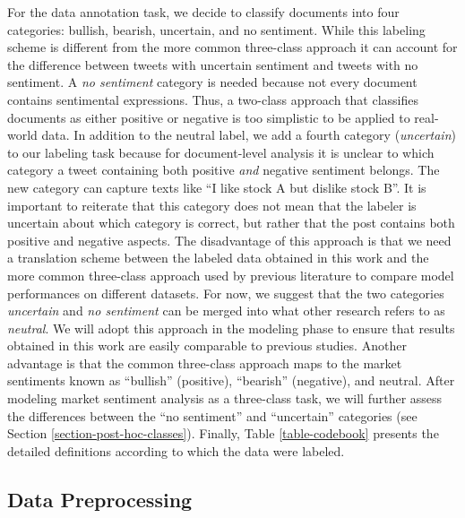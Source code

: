 For the data annotation task, we decide to classify documents into four categories: bullish, bearish, uncertain, and no sentiment. While this labeling scheme is different from the more common three-class approach it can account for the difference between tweets with uncertain sentiment and tweets with no sentiment. A \emph{no sentiment} category is needed because not every document contains sentimental expressions. Thus, a two-class approach that classifies documents as either positive or negative is too simplistic to be applied to real-world data. In addition to the neutral label, we add a fourth category (\emph{uncertain}) to our labeling task because for document-level analysis it is unclear to which category a tweet containing both positive \emph{and} negative sentiment belongs. The new category can capture texts like ``I like stock A but dislike stock B''. It is important to reiterate that this category does not mean that the labeler is uncertain about which category is correct, but rather that the post contains both positive and negative aspects.
 The disadvantage of this approach is that we need a translation scheme between the labeled data obtained in this work and the more common three-class approach used by previous literature to compare model performances on different datasets. For now, we suggest that the two categories \emph{uncertain} and \emph{no sentiment} can be merged into what other research refers to as \emph{neutral}. We will adopt this approach in the modeling phase to ensure that results obtained in this work are easily comparable to previous studies. Another advantage is that the common three-class approach maps to the market sentiments known as ``bullish'' (positive), ``bearish'' (negative), and neutral. After modeling market sentiment analysis as a three-class task, we will further assess the differences between the ``no sentiment'' and ``uncertain'' categories (see Section \ref{section-post-hoc-classes}).
 Finally, Table \ref{table-codebook} presents the detailed definitions according to which the data were labeled.
 



\subsection{Data Preprocessing}
\label{section-data-preprocessing}

